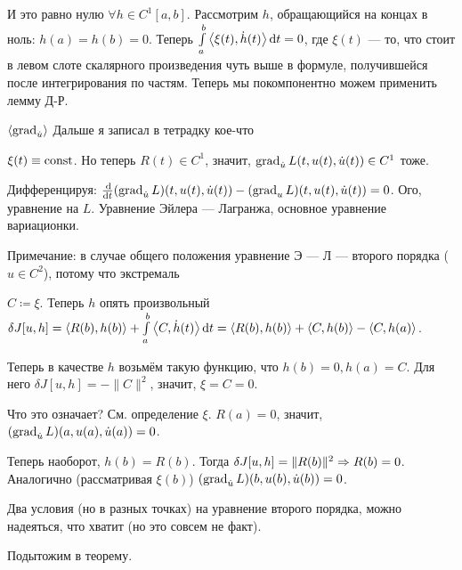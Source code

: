 \documentclass[a4paper]{report}
\begin{document}
    И это равно нулю $\forall h \in C^1[a, b]$. Рассмотрим $h$, обращающийся на концах в ноль: $h(a)=h(b)=0$. Теперь $\int\limits_{a}^{b}\left\langle\xi(t), \dot{h}(t)\right\rangle\operatorname{d}\! t = 0$, где $\xi(t)$ --- то, что стоит в левом слоте скалярного произведения чуть выше в формуле, получившейся после интегрирования по частям. Теперь мы покомпонентно можем применить лемму Д-Р.
    
    $\left\langle\operatorname{grad}_{\dot{u}}\right\rangle$
    Дальше я записал в тетрадку кое-что %

    $\xi(t) \equiv \operatorname{const}$. Но теперь $R(t) \in C^1$, значит, $\operatorname{grad}_{\dot{u}}L(t, u(t), \dot{u}(t)) \in C^1$ тоже.

    Дифференцируя: $\frac{\operatorname{d}\!}{\operatorname{d}\! t}(\operatorname{grad}_{\dot{u}} L)(t, u(t), \dot{u}(t)) - (\operatorname{grad}_u L)(t, u(t), \dot{u}(t)) = 0$. Ого, уравнение на $L$. Уравнение Эйлера --- Лагранжа, основное уравнение вариационки.

    Примечание: в случае общего положения уравнение Э --- Л --- второго порядка ($u \in C^2$), потому что экстремаль 

    $C \coloneqq \xi$. Теперь $h$ опять произвольный $\delta J[u, h] = \left\langle R(b), h(b)\right\rangle + \int\limits_{a}^{b}\left\langle C, \dot{h}(t)\right\rangle\operatorname{d}\! t = \left\langle R(b), h(b)\right\rangle + \left\langle C, h(b)\right\rangle - \left\langle C, h(a)\right\rangle$.

    Теперь в качестве $h$ возьмём такую функцию, что $h(b) = 0, h(a) = C$. Для него $\delta J[u, h] = -\|C\|^2$, значит, $\xi = C = 0$.

    Что это означает? См. определение $\xi$. $R(a) = 0$, значит, $(\operatorname{grad}_{\dot{u}} L)(a, u(a), \dot{u}(a)) = 0$.

    Теперь наоборот, $h(b) = R(b)$. Тогда $\delta J[u, h] = \|R(b)\|^2 \Rightarrow R(b) = 0$.
    Аналогично (рассматривая $\xi(b)$) $(\operatorname{grad}_{\dot{u}} L)(b, u(b), \dot{u}(b)) = 0$.

    Два условия (но в разных точках) на уравнение второго порядка, можно надеяться, что хватит (но это совсем не факт).

    Подытожим в теорему.
\end{document}
